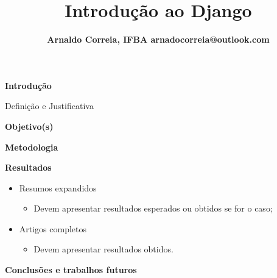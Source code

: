 \documentclass[18pt]{beamer}
\title[]{
{\fontsize{28pt}{30}\selectfont\textbf{Introdução ao Django}}}
\author{
{\fontsize{18pt}{20}\selectfont \textbf{
Arnaldo Correia, IFBA  arnadocorreia@outlook.com
}}}
\begin{document}
{\logotitle
\begin{frame}
\maketitle
\end{frame}
}



\begin{frame}{\fontsize{20pt}{20}\selectfont \textbf{Introdução}}

Definição e Justificativa

\end{frame}



\begin{frame}{\fontsize{20pt}{20}\selectfont \textbf{Objetivo(s)}}



\end{frame}


\begin{frame}{\fontsize{20pt}{20}\selectfont \textbf{Metodologia}}



\end{frame}


\begin{frame}{\fontsize{20pt}{20}\selectfont \textbf{Resultados}}

\begin{itemize}
    \item Resumos expandidos
    \begin{itemize}
        \item Devem apresentar resultados esperados ou obtidos se for o caso;
    \end{itemize}
    \item Artigos completos
    \begin{itemize}
        \item Devem apresentar resultados obtidos.
    \end{itemize}
\end{itemize}

\end{frame}


\begin{frame}{\fontsize{20pt}{20}\selectfont \textbf{Conclusões e trabalhos futuros}}



\end{frame}
\end{document}
